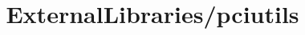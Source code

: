 \documentclass{article}
\begin{document}
\title{ExternalLibraries/pciutils}

\maketitle


\end{document}
